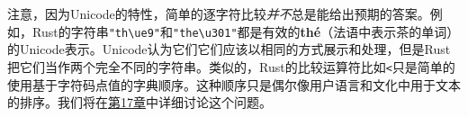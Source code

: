 注意，因为Unicode的特性，简单的逐字符比较\emph{并不}总是能给出预期的答案。例如，Rust的字符串\texttt{"th\textbackslash u{e9}"}和\texttt{"the\textbackslash u{301}"}都是有效的\textbf{thé}（法语中表示茶的单词）的Unicode表示。Unicode认为它们它们应该以相同的方式展示和处理，但是Rust把它们当作两个完全不同的字符串。类似的，Rust的比较运算符比如\texttt{<}只是简单的使用基于字符码点值的字典顺序。这种顺序只是偶尔像用户语言和文化中用于文本的排序。我们将在\hyperref[ch17]{第17章}中详细讨论这个问题。





















